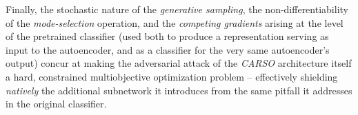 Finally, the stochastic nature of the \textit{generative sampling}, the non-differentiability of the \textit{mode-selection} operation, and the \textit{competing gradients} arising at the level of the pretrained classifier (used both to produce a representation serving as input to the autoencoder, and as a classifier for the very same autoencoder’s output) concur at making the adversarial attack of the \textit{CARSO} architecture itself a hard, constrained multiobjective optimization problem – effectively shielding \textit{natively} the additional subnetwork it introduces from the same pitfall it addresses in the original classifier.